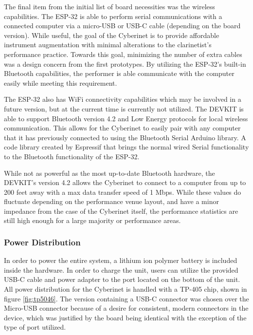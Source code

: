 The final item from the initial list of board necessities was the wireless capabilities. The ESP-32 is able to perform serial communications with a connected computer via a micro-USB or USB-C cable (depending on the board version). While useful, the goal of the Cyberinet is to provide affordable instrument augmentation with minimal alterations to the clarinetist's performance practice. Towards this goal, minimizing the number of extra cables was a design concern from the first prototypes. By utilizing the ESP-32's built-in Bluetooth capabilities, the performer is able communicate with the computer easily while meeting this requirement.

The ESP-32 also has WiFi connectivity capabilities which may be involved in a future version, but at the current time is currently not utilized. The DEVKIT is able to support Bluetooth version 4.2 and Low Energy protocols for local wireless communication. This allows for the Cyberinet to easily pair with any computer that it has previously connected to using the Bluetooth Serial Arduino library. A code library created by Espressif that brings the normal wired Serial functionality to the Bluetooth functionality of the ESP-32.

While not as powerful as the most up-to-date Bluetooth hardware, the DEVKIT's version 4.2 allows the Cyberinet to connect to a computer from up to 200 feet away with a max data transfer speed of 1 Mbps\cite{btSpecs}. While these values do fluctuate depending on the performance venue layout, and have a minor impedance from the case of the Cyberinet itself, the performance statistics are still high enough for a large majority or performance areas.

\subsubsection{Power Distribution}
In order to power the entire system, a lithium ion polymer battery is included inside the hardware. In order to charge the unit, users can utilize the provided USB-C cable and power adapter to the port located on the bottom of the unit. All power distribution for the Cyberinet is handled with a TP-405 chip, shown in figure \ref{fig:tp5046}. The version containing a USB-C connector was chosen over the Micro-USB connector because of a desire for consistent, modern connectors in the device, which was justified by the board being identical with the exception of the type of port utilized.



